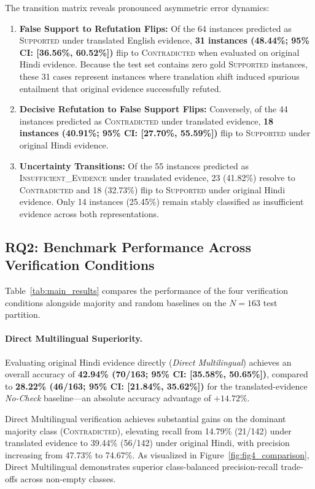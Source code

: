 The transition matrix reveals pronounced asymmetric error dynamics:
\begin{enumerate}
    \item \textbf{False Support to Refutation Flips:} Of the 64 instances predicted as \textsc{Supported} under translated English evidence, \textbf{31 instances (48.44\%; 95\% CI: [36.56\%, 60.52\%])} flip to \textsc{Contradicted} when evaluated on original Hindi evidence. Because the test set contains zero gold \textsc{Supported} instances, these 31 cases represent instances where translation shift induced spurious entailment that original evidence successfully refuted.
    \item \textbf{Decisive Refutation to False Support Flips:} Conversely, of the 44 instances predicted as \textsc{Contradicted} under translated evidence, \textbf{18 instances (40.91\%; 95\% CI: [27.70\%, 55.59\%])} flip to \textsc{Supported} under original Hindi evidence.
    \item \textbf{Uncertainty Transitions:} Of the 55 instances predicted as \textsc{Insufficient\_Evidence} under translated evidence, 23 (41.82\%) resolve to \textsc{Contradicted} and 18 (32.73\%) flip to \textsc{Supported} under original Hindi evidence. Only 14 instances (25.45\%) remain stably classified as insufficient evidence across both representations.
\end{enumerate}

\subsection{RQ2: Benchmark Performance Across Verification Conditions}
Table~\ref{tab:main_results} compares the performance of the four verification conditions alongside majority and random baselines on the $N=163$ test partition.



\paragraph{Direct Multilingual Superiority.}
Evaluating original Hindi evidence directly (\emph{Direct Multilingual}) achieves an overall accuracy of \textbf{42.94\% (70/163; 95\% CI: [35.58\%, 50.65\%])}, compared to \textbf{28.22\% (46/163; 95\% CI: [21.84\%, 35.62\%])} for the translated-evidence \emph{No-Check} baseline---an absolute accuracy advantage of $+14.72\%$. 

Direct Multilingual verification achieves substantial gains on the dominant majority class (\textsc{Contradicted}), elevating recall from 14.79\% (21/142) under translated evidence to 39.44\% (56/142) under original Hindi, with precision increasing from 47.73\% to 74.67\%. As visualized in Figure~\ref{fig:fig4_comparison}, Direct Multilingual demonstrates superior class-balanced precision-recall trade-offs across non-empty classes.

